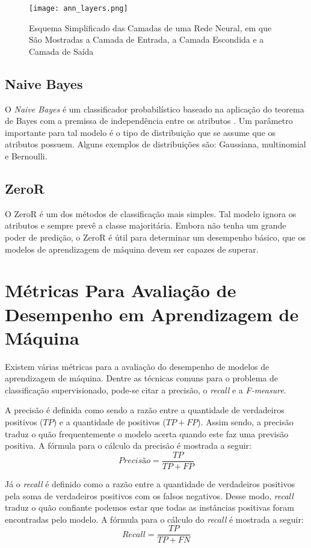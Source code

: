 \begin{figure}[!ht]
    \caption{Esquema Simplificado das Camadas de uma Rede Neural, em que São
    Mostradas a Camada de Entrada, a Camada Escondida e a Camada de Saída}
    \centering
    \texttt{[image: ann\_layers.png]}
    \label{ann_layers}
\end{figure}

\subsection{Naive Bayes}
O \textit{Naive Bayes} é um classificador
probabilístico baseado na aplicação do teorema de Bayes com a premissa de
independência entre os atributos \cite{ml_book}. Um parâmetro importante para tal
modelo é o tipo de distribuição que se assume que os atributos possuem. Alguns
exemplos de distribuições são: Gaussiana, multinomial e Bernoulli. 

\subsection{ZeroR}
O ZeroR é um dos métodos de classificação mais simples. Tal modelo ignora os
atributos e sempre prevê a classe majoritária. Embora não tenha um grande poder de
predição, o ZeroR é útil para determinar um desempenho básico, que os modelos de
aprendizagem de máquina devem ser capazes de superar. 

\section{Métricas Para Avaliação de Desempenho em Aprendizagem de Máquina}
Existem várias métricas para a avaliação do desempenho de modelos de aprendizagem de
máquina. Dentre as técnicas comuns para o problema de classificação supervisionado,
pode-se citar a precisão, o \textit{recall} e a \textit{F-measure}.  

\par A precisão é definida como sendo a razão entre a quantidade de verdadeiros
positivos ($TP$) e a quantidade de positivos ($TP + FP$). Assim sendo, a precisão
traduz o quão frequentemente o modelo acerta quando este faz uma previsão positiva.
A fórmula para o cálculo da precisão é mostrada a seguir: 
\begin{equation}
    Precisão = \frac{TP}{TP + FP}
\end{equation}

Já o \textit{recall} é definido como a razão entre a quantidade de verdadeiros
positivos pela soma de verdadeiros positivos com os falsos negativos. Desse modo,
\textit{recall} traduz o quão confiante podemos estar que todas as instâncias
positivas foram encontradas pelo modelo. A fórmula para o cálculo do \textit{recall} é
mostrada a seguir: 
\begin{equation}
    Recall = \frac{TP}{TP + FN}
\end{equation}

